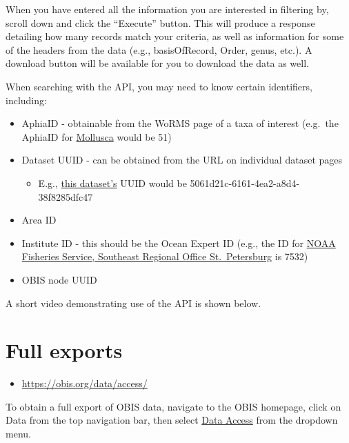 \documentclass[
  letterpaper,
  DIV=11,
  numbers=noendperiod,
  oneside]{scrreprt}
\providecommand{\tightlist}{%
  \setlength{\itemsep}{0pt}\setlength{\parskip}{0pt}}\usepackage{longtable,booktabs,array}
\begin{document}
When you have entered all the information you are interested in
filtering by, scroll down and click the ``Execute'' button. This will
produce a response detailing how many records match your criteria, as
well as information for some of the headers from the data (e.g.,
basisOfRecord, Order, genus, etc.). A download button will be available
for you to download the data as well.

When searching with the API, you may need to know certain identifiers,
including:

\begin{itemize}
\tightlist
\item
  AphiaID - obtainable from the WoRMS page of a taxa of interest
  (e.g.~the AphiaID for
  \href{https://www.marinespecies.org/aphia.php?p=taxdetails\&id=51}{Mollusca}
  would be 51)
\item
  Dataset UUID - can be obtained from the URL on individual dataset
  pages

  \begin{itemize}
  \tightlist
  \item
    E.g.,
    \href{https://obis.org/dataset/5061d21c-6161-4ea2-a8d4-38f8285dfc47}{this
    dataset's} UUID would be 5061d21c-6161-4ea2-a8d4-38f8285dfc47
  \end{itemize}
\item
  Area ID
\item
  Institute ID - this should be the Ocean Expert ID (e.g., the ID for
  \href{https://oceanexpert.org/institution/7532}{NOAA Fisheries
  Service, Southeast Regional Office St.~Petersburg} is 7532)
\item
  OBIS node UUID
\end{itemize}

A short video demonstrating use of the API is shown below.

\hypertarget{full-exports}{%
\section{Full exports}\label{full-exports}}

\begin{itemize}
\tightlist
\item
  \url{https://obis.org/data/access/}
\end{itemize}

To obtain a full export of OBIS data, navigate to the OBIS homepage,
click on Data from the top navigation bar, then select
\href{https://obis.org/data/access/}{Data Access} from the dropdown
menu.
\end{document}
